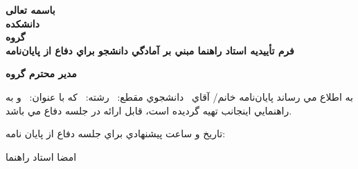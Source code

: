 
\begin{center}

\fontsize{12}{16}\selectfont\textbf{باسمه تعالی} \\
\fontsize{12}{16}\selectfont\textbf{دانشکده \FacultyFA} \\
\fontsize{12}{16}\selectfont\textbf{گروه \DepartmentFA} \\
\fontsize{16}{20}\selectfont\textbf{فرم تأييديه استاد راهنما مبني بر آمادگي دانشجو براي دفاع از پايان‌نامه}

\end{center}

\noindent\fontsize{14}{18}\selectfont\textbf{مدير محترم گروه}
\par

{\noindent\fontsize{14}{18}\selectfont
  به اطلاع مي رساند پايان‌نامه خانم/ آقاي 
  \StudentNameFA \
   دانشجوي مقطع:
   \DegreeFA \
   رشته:
   \MajorFA \
   كه با عنوان:
   \TitleFA \
   و به راهنمايي اينجانب تهيه گرديده است، قابل ارائه در جلسه دفاع مي باشد.} \par

   \vspace*{0.3cm}

  \noindent تاريخ و ساعت پيشنهادي براي جلسه دفاع از پايان نامه: 
   \par

   \hspace*{4cm} \fontsize{14}{18}\selectfont امضا استاد راهنما

   \clearpage
   
